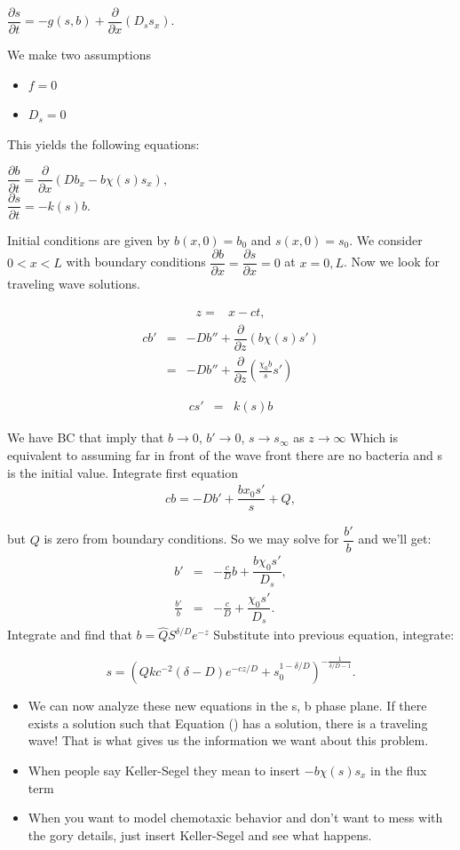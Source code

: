 \documentclass[]{article}
\numberwithin{equation}{section}		%
\def\bea{\begin{eqnarray}}
\def\ena{\end{eqnarray}}
\begin{document}
\begin{center}
$\dfrac{\partial s}{\partial t}=-g(s,b) + \dfrac{\partial }{\partial x}(D_{s}s_{x}).$
\end{center}

We make two assumptions
\begin{itemize}
\item $f=0$
\item $D_{s}=0$
\end{itemize}

This yields the following equations:

\begin{center}
$\dfrac{\partial b}{\partial t}=\dfrac{\partial}{\partial x}(Db_{x}-b\chi(s)s_{x}),$\\
$\dfrac{\partial s}{\partial t}=-k(s)b.$
\end{center}

\noindent Initial conditions are given by $b(x,0)=b_{0}$ and $s(x,0) = s_{0}$. We consider  $0<x<L$ with boundary conditions $\dfrac{\partial b}{\partial x} = \dfrac{\partial s}{\partial x} = 0$ at $x=0,L$. Now we look for traveling wave solutions. 

\begin{center}
\bea
z=&x-ct,
\ena
\bea
cb'&=&-Db''+\dfrac{\partial}{\partial z}(b\chi(s)s')\nonumber \\
&=&-Db''+\dfrac{\partial}{\partial z}(\frac{\chi_0 b}{s} s') \nonumber
\ena

\bea
cs'&=&k(s)b
\ena
\end{center}
We have BC that imply that $b\rightarrow 0$, $b'\rightarrow 0$, $s\rightarrow s_{\infty}$ as $z\rightarrow\infty$
Which is equivalent to assuming far in front of the wave front there are no bacteria and s is the initial value.
 Integrate first equation
\bea
cb=-Db'+\dfrac{bx_{0}s'}{s}+Q, 
\ena

but $Q$ is zero from boundary conditions. So we may solve for $\dfrac{b'}{b}$ and we'll get:
\bea
b'&=&-\frac{c}{D}b+\dfrac{b\chi_{0}s'}{D_{s}}, \nonumber \\
\frac{b'}{b} &=&-\frac{c}{D}+\dfrac{\chi_{0}s'}{D_{s}}.
\ena
Integrate and find that $b=\hat Q S^{\delta/D}e^{-z}$
Substitute into previous equation, integrate:

$$s=(Qkc^{-2}(\delta-D)e^{-cz/D}+s_0^{1-\delta/D})^{-\frac{1}{\delta/D-1}}.$$
\begin{itemize}
\item We can now analyze these new equations in the s, b phase plane. If there exists a solution such that Equation () has a solution, there is a traveling wave! That is what gives us the information we want about this problem.
\item When people say Keller-Segel they mean to insert $-b\chi(s)s_{x}$ in the flux term
\item When you want to model chemotaxic behavior and don't want to mess with the gory details, just insert Keller-Segel and see what happens.
\end{itemize}
\end{document}
